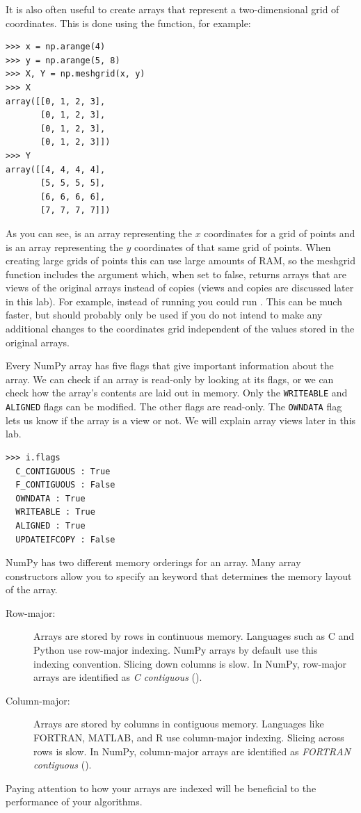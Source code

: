 It is also often useful to create arrays that represent a two-dimensional grid of coordinates.
This is done using the  function, for example:
\begin{lstlisting}
>>> x = np.arange(4)
>>> y = np.arange(5, 8)
>>> X, Y = np.meshgrid(x, y)
>>> X
array([[0, 1, 2, 3],
       [0, 1, 2, 3],
       [0, 1, 2, 3],
       [0, 1, 2, 3]])
>>> Y
array([[4, 4, 4, 4],
       [5, 5, 5, 5],
       [6, 6, 6, 6],
       [7, 7, 7, 7]])
\end{lstlisting}
As you can see,  is an array representing the $x$ coordinates for a grid of points and  is an array representing the $y$ coordinates of that same grid of points.
When creating large grids of points this can use large amounts of RAM, so the meshgrid function includes the  argument which, when set to false, returns arrays that are views of the original arrays instead of copies (views and copies are discussed later in this lab).
For example, instead of running  you could run .
This can be much faster, but should probably only be used if you do not intend to make any additional changes to the coordinates grid independent of the values stored in the original arrays.

Every NumPy array has five flags that give important information about the array.
We can check if an array is read-only by looking at its flags, or we can check how the array's contents are laid out in memory.
Only the \texttt{WRITEABLE} and \texttt{ALIGNED} flags can be modified.  The other flags are read-only.  
The \texttt{OWNDATA} flag lets us know if the array is a view or not.
We will explain array views later in this lab.
\begin{lstlisting}
>>> i.flags
  C_CONTIGUOUS : True
  F_CONTIGUOUS : False
  OWNDATA : True
  WRITEABLE : True
  ALIGNED : True
  UPDATEIFCOPY : False
\end{lstlisting}
NumPy has two different memory orderings for an array.
Many array constructors allow you to specify an  keyword that determines the memory layout of the array.
\begin{description}
\item[Row-major:] Arrays are stored by rows in continuous memory.
Languages such as C and Python use row-major indexing.  NumPy arrays by default use this indexing convention.
Slicing down columns is slow.  In NumPy, row-major arrays are identified as \emph{C contiguous} ().
\item[Column-major:] Arrays are stored by columns in contiguous memory.
Languages like FORTRAN, MATLAB, and R use column-major indexing.  Slicing across rows is slow.
In NumPy, column-major arrays are identified as \emph{FORTRAN contiguous} ().
\end{description}
Paying attention to how your arrays are indexed will be beneficial to the performance of your algorithms.
 
